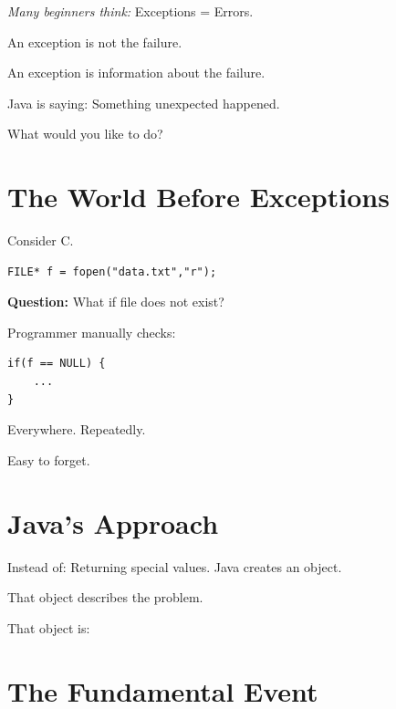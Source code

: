 \documentclass[11pt,a4paper]{book}
\newcommand{\question}[1]{
\vspace{0.5em}
\textbf{Question:} #1?
\vspace{0.2em}
}
\begin{document}
\begin{trap}

\emph{Many beginners think:}
\textcolor{RosettaDeepGreen}{Exceptions}
=
\textcolor{RosettaOrange}{Errors}.

{\ttfamily{\textcolor{RosettaDeepGreen}{False}}}

An exception is not the failure.

An exception is information
about the failure.

Java is saying: 
Something unexpected happened.

What would you like to do?
\end{trap}

\section{The World Before Exceptions}

Consider C.

\begin{verbatim} 
FILE* f = fopen("data.txt","r");
\end{verbatim}

\question{What if file does not exist}

Programmer manually checks:

\begin{verbatim} 
if(f == NULL) {
    ...
}
\end{verbatim}

Everywhere.
Repeatedly.

Easy to forget.

\section{Java's Approach}

Instead of:
Returning special values.
Java creates an object.

That object describes the problem.

That object is:

{}

\section{The Fundamental Event}
\end{document}
